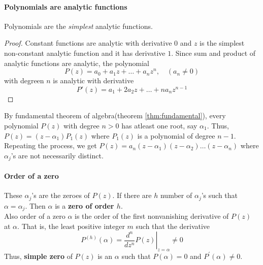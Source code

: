 \paragraph{Polynomials are analytic functions}
Polynomials are the \textit{simplest} analytic functions.
\begin{proof}
Constant functions are analytic with derivative $0$ and $z$ is the simplest non-constant analytic function and it has derivative $1$.
Since sum and product of analytic functions are analytic, the polynomial
\begin{equation}
	P(z) = a_0 + a_1 z + \dots + a_nz^n,\quad (a_n \ne 0)
\end{equation}
with degreen $n$ is analytic with derivative
\begin{equation}
	P'(z) = a_1 + 2a_2z + \dots + na_nz^{n-1}
\end{equation}
\end{proof}

By fundamental theorem of algebra(theorem \ref{thm:fundamental}), every polynomial $P(z)$ with degree $n > 0$ has atleast one root, say $\alpha_1$.
Thus, $P(z) = (z-\alpha_1)P_1(z)$ where $P_1(z)$ is a polynomial of degree $n-1$.
Repeating the process, we get $P(z) = a_n(z-\alpha_1)(z-\alpha_2)\dots(z-\alpha_n)$ where $\alpha_j$'s are not necessarily distinct.\\

\paragraph{Order of a zero}
These $\alpha_j$'s are the zeroes of $P(z)$.
If there are $h$ number of $\alpha_j$'s such that $\alpha = \alpha_j$. Then $\alpha$ is a \textbf{zero of order $h$}.\\

Also order of a zero $\alpha$ is the order of the first nonvanishing derivative of $P(z)$ at $\alpha$.
That is, the least positive integer $m$ such that the derivative \[ P^{(h)}(\alpha) = \left.\frac{d^n}{dz^n}P(z)\right|_{z=\alpha} \ne 0 \]
Thus, \textbf{simple zero} of $P(z)$ is an $\alpha$ such that $P(\alpha) = 0$ and $P^\prime(\alpha) \ne 0$.

